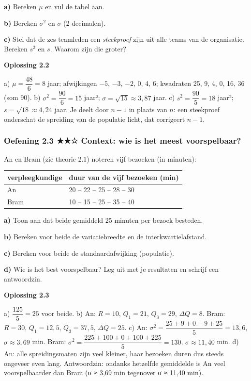 \textbf{a)} Bereken $\mu$ en vul de tabel aan. \lijn

\textbf{b)} Bereken $\sigma^2$ en $\sigma$ (2 decimalen). \lijn

\textbf{c)} Stel dat de zes teamleden een \emph{steekproef} zijn uit alle teams van de organisatie. Bereken $s^2$ en $s$. Waarom zijn die groter? \lijn

\begin{oplossing}
\textbf{Oplossing 2.2}

a) $\mu=\dfrac{48}{6}=8$ jaar; afwijkingen $-5$, $-3$, $-2$, 0, 4, 6; kwadraten 25, 9, 4, 0, 16, 36 (som 90). b) $\sigma^2=\dfrac{90}{6}=15$ jaar²; $\sigma=\sqrt{15}\approx 3{,}87$ jaar. c) $s^2=\dfrac{90}{5}=18$ jaar²; $s=\sqrt{18}\approx 4{,}24$ jaar. Je deelt door $n-1$ in plaats van $n$: een steekproef onderschat de spreiding van de populatie licht, dat corrigeert $n-1$.
\end{oplossing}

\subsubsection*{Oefening 2.3 \quad ★★☆ \quad Context: wie is het meest voorspelbaar?}

An en Bram (zie theorie 2.1) noteren vijf bezoeken (in minuten):

\begin{tabular}{ll}
\hline
verpleegkundige & duur van de vijf bezoeken (min) \\
\hline
An & 20 – 22 – 25 – 28 – 30 \\
Bram & 10 – 15 – 25 – 35 – 40 \\
\hline
\end{tabular}

\textbf{a)} Toon aan dat beide gemiddeld 25 minuten per bezoek besteden. \lijn

\textbf{b)} Bereken voor beide de variatiebreedte en de interkwartielafstand. \lijn

\textbf{c)} Bereken voor beide de standaardafwijking (populatie). \lijn

\textbf{d)} Wie is het best voorspelbaar? Leg uit met je resultaten en schrijf een antwoordzin. \lijn

\begin{oplossing}
\textbf{Oplossing 2.3}

a) $\dfrac{125}{5}=25$ voor beide. b) An: $R=10$, $Q_1=21$, $Q_3=29$, $\Delta Q=8$. Bram: $R=30$, $Q_1=12{,}5$, $Q_3=37{,}5$, $\Delta Q=25$. c) An: $\sigma^2=\dfrac{25+9+0+9+25}{5}=13{,}6$, $\sigma\approx 3{,}69$ min. Bram: $\sigma^2=\dfrac{225+100+0+100+225}{5}=130$, $\sigma\approx 11{,}40$ min. d) An: alle spreidingsmaten zijn veel kleiner, haar bezoeken duren dus steeds ongeveer even lang. Antwoordzin: ondanks hetzelfde gemiddelde is An veel voorspelbaarder dan Bram (σ ≈ 3,69 min tegenover σ ≈ 11,40 min).
\end{oplossing}

